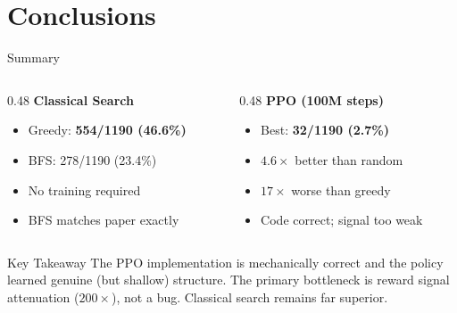 \documentclass[aspectratio=169,11pt]{beamer}
\begin{document}
\section{Conclusions}

\begin{frame}{Summary}
  \begin{columns}[T]
    \begin{column}{0.48\textwidth}
      \textbf{Classical Search}
      \begin{itemize}
        \item Greedy: \textcolor{good}{\textbf{554/1190 (46.6\%)}}
        \item BFS: 278/1190 (23.4\%)
        \item No training required
        \item BFS matches paper exactly
      \end{itemize}
    \end{column}
    \begin{column}{0.48\textwidth}
      \textbf{PPO (100M steps)}
      \begin{itemize}
        \item Best: \textcolor{bad}{\textbf{32/1190 (2.7\%)}}
        \item $4.6\times$ better than random
        \item $17\times$ worse than greedy
        \item Code correct; signal too weak
      \end{itemize}
    \end{column}
  \end{columns}

  \bigskip
  \begin{block}{Key Takeaway}
    The PPO implementation is mechanically correct and the policy learned genuine
    (but shallow) structure.  The primary bottleneck is reward signal attenuation
    ($200\times$), not a bug.  Classical search remains far superior.
  \end{block}
\end{frame}

\appendix
\end{document}
